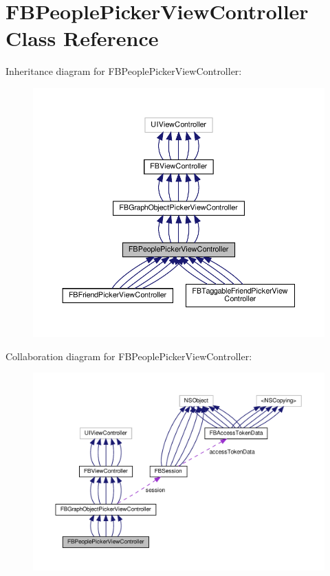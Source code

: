 \hypertarget{interfaceFBPeoplePickerViewController}{}\section{F\+B\+People\+Picker\+View\+Controller Class Reference}
\label{interfaceFBPeoplePickerViewController}


Inheritance diagram for F\+B\+People\+Picker\+View\+Controller\+:
\nopagebreak
\begin{figure}[H]
\begin{center}
\leavevmode
\includegraphics[width=350pt]{interfaceFBPeoplePickerViewController__inherit__graph}
\end{center}
\end{figure}


Collaboration diagram for F\+B\+People\+Picker\+View\+Controller\+:
\nopagebreak
\begin{figure}[H]
\begin{center}
\leavevmode
\includegraphics[width=350pt]{interfaceFBPeoplePickerViewController__coll__graph}
\end{center}
\end{figure}
